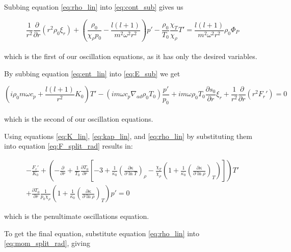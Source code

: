 \documentclass[11pt]{amsart}
\begin{document}
Subbing equation \ref{eq:rho_lin} into \ref{eq:cont_sub} gives us

\begin{equation} \label{eq:cont_osc}
\frac{1}{r^{2}} \frac{\partial}{\partial r} ( r^{2} \rho_{0} \xi_{r} )  
+ \left( \frac{\rho_{0}}{\chi_{\rho} p_{0}} - \frac{l (l+1)}{m^{2} \omega^{2} r^{2}} \right) p'
- \frac{\rho_{0}}{T_{0}} \frac{\chi_{T}}{\chi_{\rho}} T'
=
\frac{l (l+1)}{m^{2} \omega^{2} r^{2}} \rho_{0} \Phi_{P}
\end{equation}
\\
which is the first of our oscillation equations, as it has only the desired variables.

By subbing equation \ref{eq:ent_lin} into \ref{eq:E_sub} we get

\begin{equation} \label{eq:ent_osc}
\left( i \rho_{0} m \omega c_{p}  + \frac{l (l+1)}{r^{2}} K_{0} \right) T'
- \left( i m \omega c_{p} \nabla_{ad} \rho_{0} T_{0}  \right) \frac{p'}{p_{0}}
+ i m \omega \rho_{0} T_{0} \frac{\partial s_{0}}{\partial r} \xi_{r}
+ \frac{1}{r^{2}} \frac{\partial}{\partial r} ( r^{2} F_{r}')
=
0
\end{equation}
\\
which is the second of our oscillation equations.

Using equations \ref{eq:K_lin}, \ref{eq:kap_lin}, and \ref{eq:rho_lin} by substituting them into equation \ref{eq:F_split_rad} results in:

\begin{multline} \label{eq:flux_osc}
- \frac{F_{r}'}{K_{0}}
+ \left( - \frac{\partial}{\partial r} + \frac{1}{T_{0}} \frac{\partial T_{0}}{\partial r} \left[ -3 + \frac{1}{\kappa_{0}} \left( \frac{\partial \kappa}{\partial \ln T} \right)_{\rho} - \frac{\chi_{T}}{\chi_{\rho}} \left( 1 + \frac{1}{\kappa_{0}} \left( \frac{\partial \kappa}{\partial \ln \rho} \right)_{T} \right) \right] \right) T' \\
+ \frac{\partial T_{0}}{\partial r} \frac{1}{p_{0} \chi_{\rho}} \left( 1 + \frac{1}{\kappa_{0}} \left( \frac{\partial \kappa}{\partial \ln \rho} \right)_{T} \right) p'
=
0
\end{multline}

which is the penultimate oscillations equation.

To get the final equation, substitute equation \ref{eq:rho_lin} into \ref{eq:mom_split_rad}, giving
\end{document}
